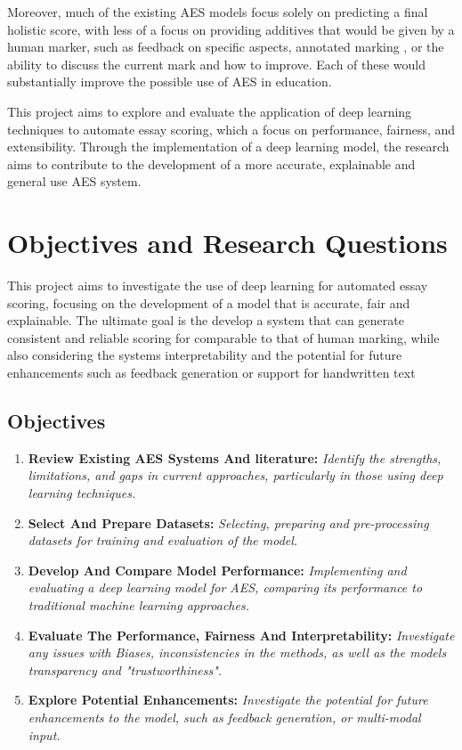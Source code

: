 \documentclass[11pt]{article}
\begin{document}
Moreover, much of the existing AES models focus solely on predicting a final holistic score, with less of a focus on providing additives that would be given by a human marker,
such as feedback on specific aspects, annotated marking , or the ability to discuss the current mark and how to improve. Each of these would substantially improve the
possible use of AES in education.

This project aims to explore and evaluate the application of deep learning techniques to automate essay scoring, which a focus on performance, fairness, and extensibility. Through the implementation of
a deep learning model, the research aims to contribute to the development of a more accurate, explainable and general use AES system.


\section*{Objectives and Research Questions}
This project aims to investigate the use of deep learning for automated essay scoring, focusing on the development of a model that
is accurate, fair and explainable. The ultimate goal is the develop a system that can generate consistent
and reliable scoring for comparable to that of human marking, while also considering the systems interpretability and the 
potential for future enhancements such as feedback generation or support for handwritten text

\subsection{Objectives}
\begin{enumerate}
    \item \textbf{Review Existing AES Systems And literature:} \textit{Identify the strengths, limitations, and gaps in current approaches,
    particularly in those using deep learning techniques.}
    \item \textbf{Select And Prepare Datasets:} \textit{Selecting, preparing and pre-processing datasets for training and evaluation of the model.}
    \item \textbf{Develop And Compare Model Performance:} \textit{Implementing and evaluating a deep learning model for AES,
    comparing its performance to traditional machine learning approaches.}
    \item \textbf{Evaluate The Performance, Fairness And Interpretability:} \textit{Investigate any issues with Biases, inconsistencies in the methods, as well as
    the models transparency and "trustworthiness".}
    \item \textbf{Explore Potential Enhancements:} \textit{Investigate the potential for future enhancements to the model, such as feedback generation, or multi-modal input.}

\end{enumerate}
\end{document}
